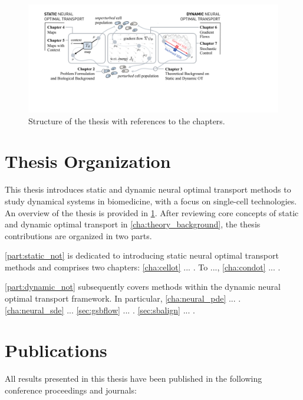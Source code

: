 \begin{figure}[t]
  \includegraphics[width=\textwidth]{figures/fig_overview_thesis.pdf}
  \caption{Structure of the thesis with references to the chapters.}
  \label{fig:overview_thesis}
\end{figure}


\section{Thesis Organization}

This thesis introduces static and dynamic neural optimal transport methods to study dynamical systems in biomedicine, with a focus on single-cell technologies. An overview of the thesis is provided in \cref{fig:overview_thesis}.
After reviewing core concepts of static and dynamic optimal transport in \cref{cha:theory_background}, the thesis contributions are organized in two parts. 

\cref{part:static_not} is dedicated to introducing static neural optimal transport methods and comprises two chapters:
\cref{cha:cellot} ... \citep{bunne2021learning}. To ..., \cref{cha:condot} ... \citep{bunne2022supervised}.

\cref{part:dynamic_not} subsequently covers methods within the dynamic neural optimal transport framework. In particular, \cref{cha:neural_pde} ... \citep{bunne2022proximal}.
\cref{cha:neural_sde} ...
\cref{sec:gsbflow} ... \citep{bunne2022recovering}.
\cref{sec:sbalign} ... \citep{somnath2023aligned}.


\section{Publications}
All results presented in this thesis have been published in the following conference proceedings and journals:


